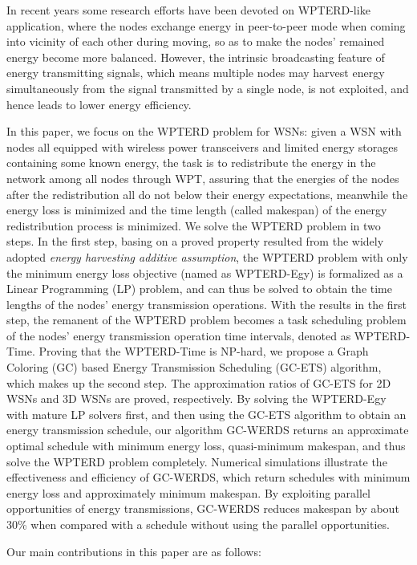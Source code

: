\documentclass[journal,10pt]{IEEEtran}
\begin{document}
In recent years some research efforts have been devoted on WPTERD-like application, where the nodes exchange energy in peer-to-peer mode when coming into vicinity of each other during moving, so as to make the nodes' remained energy become more balanced. However, the intrinsic broadcasting feature of energy transmitting signals, which means multiple nodes may harvest energy simultaneously from the signal transmitted by a single node, is not exploited, and hence leads to lower energy efficiency.

In this paper, we focus on the WPTERD problem for WSNs: given a WSN with nodes all equipped with wireless power transceivers and limited energy storages containing some known energy, the task is to redistribute the energy in the network among all nodes through WPT, assuring that the energies of the nodes after the redistribution all do not below their energy expectations, meanwhile the energy loss is minimized and the time length (called makespan) of the energy redistribution process is minimized. We solve the WPTERD problem in two steps. In the first step, basing on a proved property resulted from the widely adopted \textit{energy harvesting additive assumption}, the WPTERD problem with only the minimum energy loss objective (named as WPTERD-Egy) is formalized as a Linear Programming (LP) problem, and can thus be solved to obtain the time lengths of the nodes' energy transmission operations. With the results in the first step, the remanent of the WPTERD problem becomes a task scheduling problem of the nodes' energy transmission operation time intervals, denoted as WPTERD-Time. Proving that the WPTERD-Time is NP-hard, we propose a Graph Coloring (GC) based Energy Transmission Scheduling (GC-ETS) algorithm, which makes up the second step. The approximation ratios of GC-ETS for 2D WSNs and 3D WSNs are proved, respectively. By solving the WPTERD-Egy with mature LP solvers first, and then using the GC-ETS algorithm to obtain an energy transmission schedule, our algorithm GC-WERDS returns an approximate optimal schedule with minimum energy loss, quasi-minimum makespan, and thus solve the WPTERD problem completely. Numerical simulations illustrate the effectiveness and efficiency of GC-WERDS, which return schedules with minimum energy loss and approximately minimum makespan. By exploiting parallel opportunities of energy transmissions, GC-WERDS reduces makespan by about 30\% when compared with a schedule without using the parallel opportunities.

Our main contributions in this paper are as follows:
\end{document}
